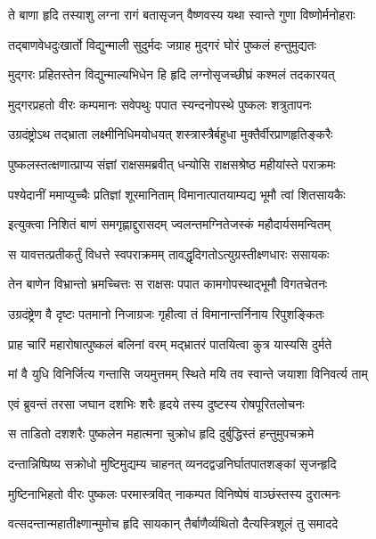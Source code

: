 \twolineshloka
{ते बाणा हृदि तस्याशु लग्ना रागं बतासृजन्}
{वैष्णवस्य यथा स्वान्ते गुणा विष्णोर्मनोहराः}%

\twolineshloka
{तद्बाणवेधदुःखार्तो विद्युन्माली सुदुर्मदः}
{जग्राह मुद्गरं घोरं पुष्कलं हन्तुमुद्यतः}%

\twolineshloka
{मुद्गरः प्रहितस्तेन विद्युन्माल्यभिधेन हि}
{हृदि लग्नोसृजच्छीघ्रं कश्मलं तदकारयत्}%

\twolineshloka
{मुद्गरप्रहतो वीरः कम्पमानः सवेपथुः}
{पपात स्यन्दनोपस्थे पुष्कलः शत्रुतापनः}%

\twolineshloka
{उग्रदंष्ट्रोऽथ तद्भ्राता लक्ष्मीनिधिमयोधयत्}
{शस्त्रास्त्रैर्बहुधा मुक्तैर्वीरप्राणहृतिङ्करैः}%

\twolineshloka
{पुष्कलस्तत्क्षणात्प्राप्य संज्ञां राक्षसमब्रवीत्}
{धन्योसि राक्षसश्रेष्ठ महीयांस्ते पराक्रमः}%

\twolineshloka
{पश्येदानीं ममाप्युच्चैः प्रतिज्ञां शूरमानिताम्}
{विमानात्पातयाम्यद्य भूमौ त्वां शितसायकैः}%

\twolineshloka
{इत्युक्त्वा निशितं बाणं समगृह्णाद्दुरासदम्}
{ज्वलन्तमग्नितेजस्कं महौदार्यसमन्वितम्}%

\twolineshloka
{स यावत्तत्प्रतीकर्तुं विधत्ते स्वपराक्रमम्}
{तावद्धृदिगतोऽत्युग्रस्तीक्ष्णधारः ससायकः}%

\twolineshloka
{तेन बाणेन विभ्रान्तो भ्रमच्चित्तः स राक्षसः}
{पपात कामगोपस्थाद्भूमौ विगतचेतनः}%

\twolineshloka
{उग्रदंष्ट्रेण वै दृष्टः पतमानो निजाग्रजः}
{गृहीत्वा तं विमानान्तर्निनाय रिपुशङ्कितः}%

\twolineshloka
{प्राह चारिं महारोषात्पुष्कलं बलिनां वरम्}
{मद्भ्रातरं पातयित्वा कुत्र यास्यसि दुर्मते}%

\twolineshloka
{मां वै युधि विनिर्जित्य गन्तासि जयमुत्तमम्}
{स्थिते मयि तव स्वान्ते जयाशा विनिवर्त्य ताम्}%

\twolineshloka
{एवं ब्रुवन्तं तरसा जघान दशभिः शरैः}
{हृदये तस्य दुष्टस्य रोषपूरितलोचनः}%

\twolineshloka
{स ताडितो दशशरैः पुष्कलेन महात्मना}
{चुक्रोध हृदि दुर्बुद्धिस्तं हन्तुमुपचक्रमे}%

\twolineshloka
{दन्तान्निष्पिष्य सक्रोधो मुष्टिमुद्यम्य चाहनत्}
{व्यनदद्वज्रनिर्घातपातशङ्कां सृजन्हृदि}%

\twolineshloka
{मुष्टिनाभिहतो वीरः पुष्कलः परमास्त्रवित्}
{नाकम्पत विनिष्पेषं वाञ्छंस्तस्य दुरात्मनः}%

\twolineshloka
{वत्सदन्तान्महातीक्ष्णान्मुमोच हृदि सायकान्}
{तैर्बाणैर्व्यथितो दैत्यस्त्रिशूलं तु समाददे}%

